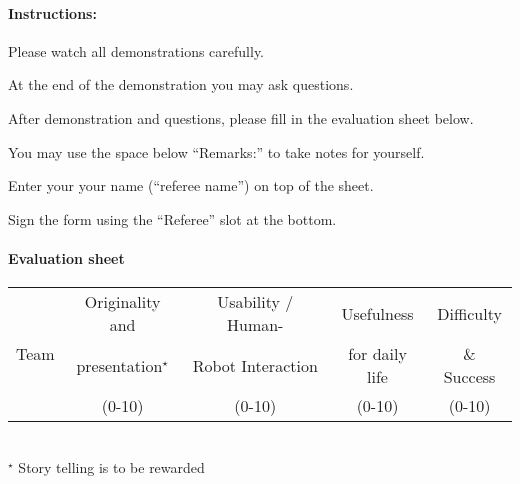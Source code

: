 \paragraph{Instructions:}
\begin{compactenum}
\item Please watch all demonstrations carefully.
\item At the end of the demonstration you may ask questions.
\item After demonstration and questions, please fill in the evaluation sheet below.
\item You may use the space below \enquote{Remarks:} to take notes for yourself.
\item Enter your your name (\enquote{referee name}) on top of the sheet.
\item Sign the form using the \enquote{Referee} slot at the bottom.
\end{compactenum}


\paragraph{Evaluation sheet}
\begin{center}

\begingroup
\newcommand\tableTEAMS{}
\def\do#1{\appto\tableTEAMS{#1 & & & &  \\\hline}}%
\expandafter\docsvlist\expandafter{\TEAMSFINALS}

\begin{tabular}{|l|c|c|c|c|}
  \hline
  \multirow{3}{*}{Team}
  & Originality and        &  Usability / Human-  &  Usefulness      & Difficulty  \\
  & presentation${}^\star$ & Robot Interaction    &  for daily life  & \& Success  \\
  & (0-10)                 &  (0-10)              &  (0-10)          & (0-10) \\
  \hline
  \hline
  \tableTEAMS
\end{tabular}\\
${}^\star$ Story telling is to be rewarded
\endgroup
\end{center}


